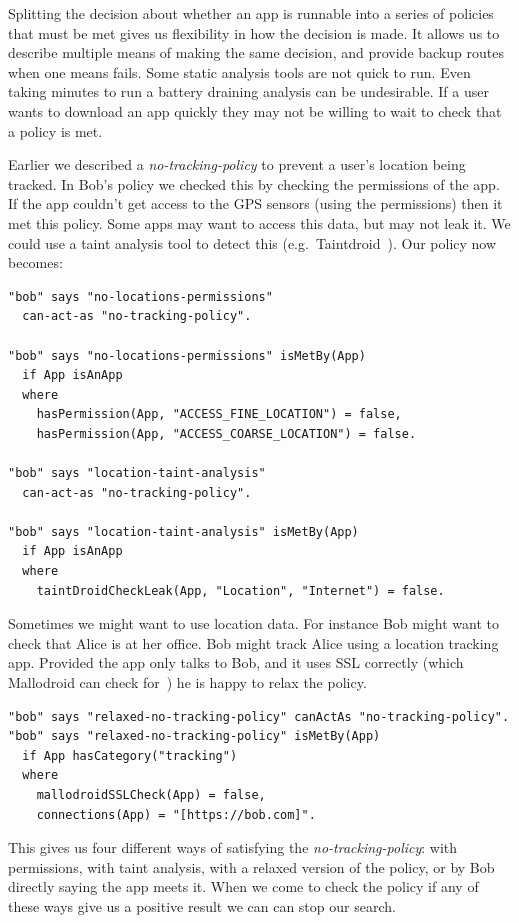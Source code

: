 \documentclass[]{llncs}
\begin{document}
Splitting the decision about whether an app is runnable into a series of policies that must be met gives us flexibility in how the decision is made.
It allows us to describe multiple means of making the same decision, and provide backup routes when one means fails.
Some static analysis tools are not quick to run.
Even taking minutes to run a battery draining analysis can be undesirable.
If a user wants to download an app quickly they may not be willing to wait to check that a policy is met.

Earlier we described a \emph{no-tracking-policy} to prevent a user's location being tracked.
In Bob's policy we checked this by checking the permissions of the app.
If the app couldn't get access to the GPS sensors (using the permissions) then it met this policy.
Some apps may want to access this data, but may not leak it.
We could use a taint analysis tool to detect this (e.g.~Taintdroid~\cite{Fritz:2013vi}).
Our policy now becomes:

\begin{lstlisting}
"bob" says "no-locations-permissions"
  can-act-as "no-tracking-policy".

"bob" says "no-locations-permissions" isMetBy(App)
  if App isAnApp
  where
    hasPermission(App, "ACCESS_FINE_LOCATION") = false,
    hasPermission(App, "ACCESS_COARSE_LOCATION") = false.

"bob" says "location-taint-analysis"
  can-act-as "no-tracking-policy".

"bob" says "location-taint-analysis" isMetBy(App)
  if App isAnApp
  where
    taintDroidCheckLeak(App, "Location", "Internet") = false.
\end{lstlisting}

Sometimes we might want to use location data.
For instance Bob might want to check that Alice is at her office.
Bob might track Alice using a location tracking app.
Provided the app only talks to Bob, and it uses SSL correctly (which Mallodroid can check for~\cite{Fahl:2012dj}) he is happy to relax the policy.

\begin{lstlisting}
"bob" says "relaxed-no-tracking-policy" canActAs "no-tracking-policy".
"bob" says "relaxed-no-tracking-policy" isMetBy(App)
  if App hasCategory("tracking")
  where
    mallodroidSSLCheck(App) = false,
    connections(App) = "[https://bob.com]".
\end{lstlisting}

This gives us four different ways of satisfying the \emph{no-tracking-policy}:
  with permissions,
  with taint analysis,
  with a relaxed version of the policy,
  or by Bob directly saying the app meets it.
When we come to check the policy if any of these ways give us a positive result we can can stop our search.
\end{document}
